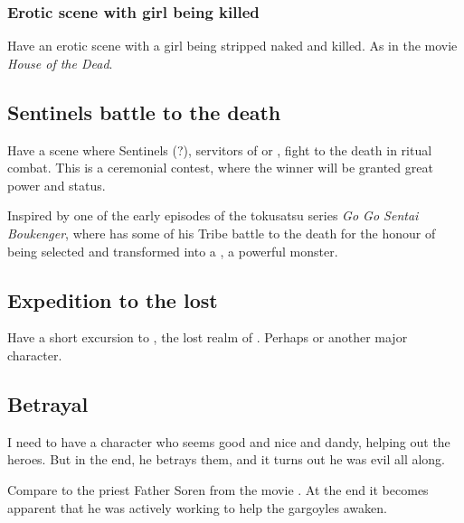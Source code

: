 \begin{garbage}
\subsubsection{Erotic scene with girl being killed}
Have an erotic scene with a girl being stripped naked and killed. As in the movie \emph{House of the Dead}. 










\subsection{Sentinels battle to the death}
Have a scene where Sentinels (\rachyth?), servitors of \Secherdamon{} or \Vizsherioch, fight to the death in ritual combat. This is a ceremonial contest, where the winner will be granted great power and status. 

Inspired by one of the early episodes of the tokusatsu series \emph{Go Go Sentai Boukenger}, where \Ryuuoun{} has some of his \Jaryuu{} Tribe battle to the death for the honour of being selected and transformed into a \Daijakuryuu, a powerful monster.







\subsection{Expedition to the lost \Dragonland}
Have a short excursion to \Dragonland, the lost realm of \dragons. Perhaps \Nzessuacrith{} or another major \draconian{} character. 







\subsection{Betrayal}
I need to have a character who seems good and nice and dandy, helping out the heroes. But in the end, he betrays them, and it turns out he was evil all along. 

Compare to the priest Father Soren from the movie \cite{Movie:GargoylesRevenge}. 
At the end it becomes apparent that he was actively working to help the gargoyles awaken. 








\end{garbage}

